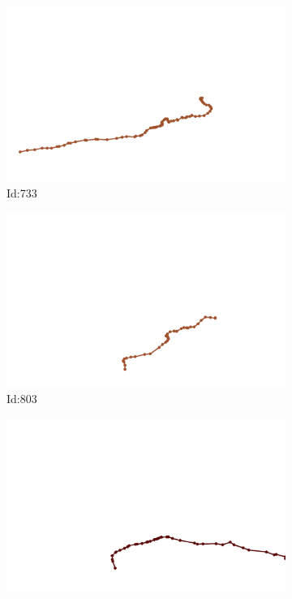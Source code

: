 \documentclass[12pt,twoside]{report}
\begin{document}
\begin{figure}
\centering
\begin{subfigure}[b]{0.20\textwidth}
\centering
\includegraphics[width=\textwidth]{../../trajectories/733.png}
\caption{Id:733}
\end{subfigure}
\begin{subfigure}[b]{0.20\textwidth}
\centering
\includegraphics[width=\textwidth]{../../trajectories/803.png}
\caption{Id:803}
\end{subfigure}
\begin{subfigure}[b]{0.20\textwidth}
\centering
\includegraphics[width=\textwidth]{../../trajectories/806.png}

\end{subfigure}
\end{figure}
\end{document}
